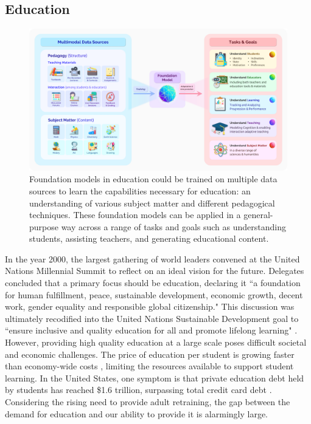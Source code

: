 \newsection
\subsection{Education}
\label{sec:education}

\begin{figure}[!ht]
    \centering
    \includegraphics[width=\linewidth]{applications/education_figs/Education.png}
    \caption{Foundation models in education could be trained on multiple data sources to learn the capabilities necessary for education: an understanding of various subject matter and different pedagogical techniques. These foundation models can be applied in a general-purpose way across a range of tasks and goals such as understanding students, assisting teachers, and generating educational content.
    }
    \label{fig:education}
\end{figure}

In the year 2000, the largest gathering of world leaders convened at the United Nations Millennial Summit to reflect on an ideal vision for the future. Delegates concluded that a primary focus should be education, declaring it ``a foundation for human fulfillment, peace, sustainable development, economic growth, decent work, gender equality and responsible global citizenship."  This discussion was ultimately recodified into the United Nations Sustainable Development goal to ``ensure inclusive and quality education for all and promote lifelong learning" \cite{unsdg2015}.
However, providing high quality education at a large scale poses difficult societal and economic challenges. The price of education per student is growing faster than economy-wide costs \cite{bowen2012cost}, limiting the resources available to support student learning. 
In the United States, one symptom is that private education debt held by students has reached \$1.6 trillion, surpassing total credit card debt \cite{friedman2020debt}. Considering the rising need to provide adult retraining, the gap between the demand for education and our ability to provide it is alarmingly large. 

